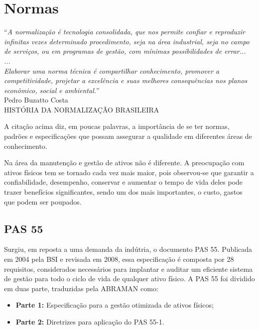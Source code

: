 \section{Normas}
\label{normas}

\begin{flushright}
	“\textit{A normalização é tecnologia consolidada, que nos
permite confiar e reproduzir infinitas vezes determinado
procedimento, seja na área industrial, seja no campo de
serviços, ou em programas de gestão, com mínimas
possibilidades de errar...
\\
...
\\
Elaborar uma norma técnica é compartilhar
conhecimento, promover a competitividade, projetar a
excelência e suas melhores consequências nos planos
econômico, social e ambiental.}”
\\
Pedro Buzatto Costa
\\
HISTÓRIA DA NORMALIZAÇÃO BRASILEIRA
\end{flushright}

A citação acima diz, em poucas palavras, a importância de se ter normas, padrões e especificações que possam assegurar a qualidade em diferentes áreas de conhecimento.

Na área da manutenção e gestão de ativos não é diferente. A preocupação com ativos físicos tem se tornado cada vez mais maior, pois observou-se que garantir a confiabilidade, desempenho, conservar e aumentar o tempo de vida deles pode trazer benefícios significantes, sendo um dos mais importantes, o custo, gastos que podem ser poupados.

\subsection{PAS 55}
\label{pas55}

Surgiu, em reposta a uma demanda da indútria, o documento PAS 55. Publicada em 2004 pela BSI e revisada em 2008, essa especificação é composta por 28 requisitos, considerados necessários para implantar e auditar um eficiente sistema de gestão para todo o ciclo de vida de qualquer ativo físico. A PAS 55 foi dividido em duas parte, traduzidas pela ABRAMAN como:

\begin{itemize}
	\item \textbf{Parte 1:} Especificação para a gestão otimizada de ativos físicos;
	\item \textbf{Parte 2:} Diretrizes para aplicação do PAS 55-1. 
\end{itemize} 

